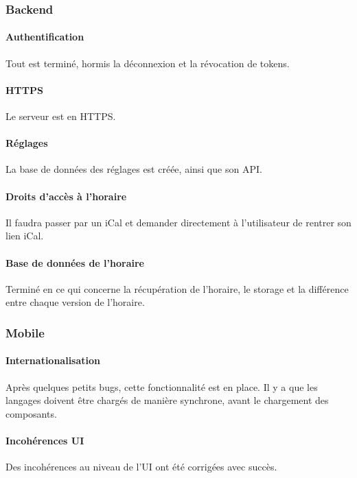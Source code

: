 \subsubsection{Backend}

	\paragraph{Authentification} Tout est terminé, hormis la déconnexion et la révocation de tokens.
	
	\paragraph{HTTPS} Le serveur est en HTTPS.
	
	\paragraph{Réglages} La base de données des réglages est créée, ainsi que son API.
	
	\paragraph{Droits d'accès à l'horaire} Il faudra passer par un iCal et demander directement à l'utilisateur de rentrer son lien iCal. \textcolor{white}{\rWalley}
	
	\paragraph{Base de données de l'horaire} Terminé en ce qui concerne la récupération de l'horaire, le storage et la différence entre chaque version de l'horaire.
	
\subsubsection{Mobile}

	\paragraph{Internationalisation} Après quelques petits bugs, cette fonctionnalité est en place. Il y a que les langages doivent être chargés de manière synchrone, avant le chargement des composants.
	
	\paragraph{Incohérences UI} Des incohérences au niveau de l'UI ont été corrigées avec succès. 
	
